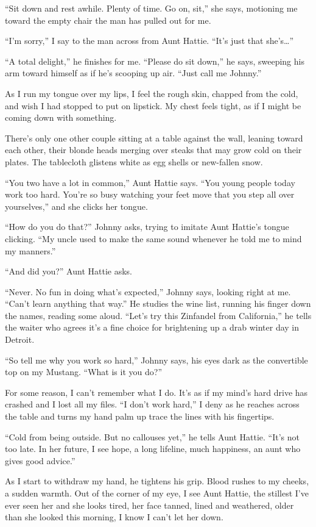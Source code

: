\documentclass[twoside,10pt]{book}
\begin{document}
``Sit down and rest awhile. Plenty of time. Go on, sit,'' she says,
motioning me toward the empty chair the man has pulled out for me.

``I'm sorry,'' I say to the man across from Aunt Hattie. ``It's just
that she's\ldots''

``A total delight,'' he finishes for me. ``Please do sit down,'' he
says, sweeping his arm toward himself as if he's scooping up air. ``Just
call me Johnny.''

As I run my tongue over my lips, I feel the rough skin, chapped from the
cold, and wish I had stopped to put on lipstick. My chest feels tight,
as if I might be coming down with something.

There's only one other couple sitting at a table against the wall,
leaning toward each other, their blonde heads merging over steaks that
may grow cold on their plates. The tablecloth glistens white as egg
shells or new-fallen snow.

``You two have a lot in common,'' Aunt Hattie says. ``You young people
today work too hard. You're so busy watching your feet move that you
step all over yourselves,'' and she clicks her tongue.

``How do you do that?'' Johnny asks, trying to imitate Aunt Hattie's
tongue clicking. ``My uncle used to make the same sound whenever he told
me to mind my manners.''

``And did you?'' Aunt Hattie asks.

``Never. No fun in doing what's expected,'' Johnny says, looking right
at me. ``Can't learn any­thing that way.'' He studies the wine list,
running his finger down the names, reading some aloud. ``Let's try this
Zinfandel from California,'' he tells the waiter who agrees it's a fine
choice for brighten­ing up a drab winter day in Detroit.

``So tell me why you work so hard,'' Johnny says, his eyes dark as the
convertible top on my Mustang. ``What is it you do?''

For some reason, I can't remember what I do. It's as if my mind's hard
drive has crashed and I lost all my files. ``I don't work hard,'' I deny
as he reaches across the table and turns my hand palm up trace the lines
with his fingertips.

``Cold from being outside. But no callouses yet,'' he tells Aunt Hattie.
``It's not too late. In her future, I see hope, a long lifeline, much
happiness, an aunt who gives good advice.''

As I start to withdraw my hand, he tightens his grip. Blood rushes to my
cheeks, a sudden warmth. Out of the corner of my eye, I see Aunt Hattie,
the stillest I've ever seen her and she looks tired, her face tanned,
lined and weathered, older than she looked this morning, I know I can't
let her down.
\end{document}
